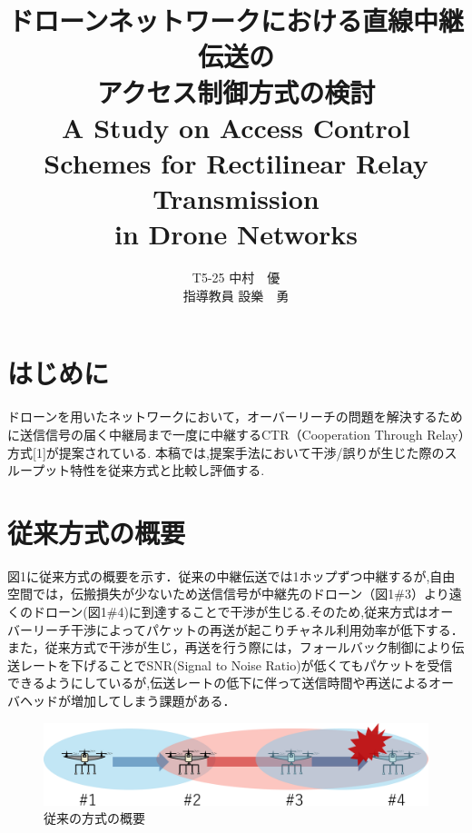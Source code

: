 \documentclass[a4paper,10pt]{ltjsarticle}
\title{\huge ドローンネットワークにおける直線中継伝送の\\アクセス制御方式の検討\\
\Large A Study on Access Control Schemes for Rectilinear Relay Transmission \\in Drone Networks
}
\author{
T5-25 \:中村　優\\
指導教員 \: 設樂　勇
}
\date{}
\begin{document}
\twocolumn[
\maketitle
]

\section{はじめに}
ドローンを用いたネットワークにおいて，オーバーリーチの問題を解決するために送信信号の届く中継局まで一度に中継するCTR（Cooperation Through Relay）方式[1]が提案されている. 本稿では,提案手法において干渉/誤りが生じた際のスループット特性を従来方式と比較し評価する.
\section{従来方式の概要}
図1に従来方式の概要を示す．従来の中継伝送では1ホップずつ中継するが,自由空間では，伝搬損失が少ないため送信信号が中継先のドローン（図1\#3）より遠くのドローン(図1\#4)に到達することで干渉が生じる.そのため,従来方式はオーバーリーチ干渉によってパケットの再送が起こりチャネル利用効率が低下する．また，従来方式で干渉が生じ，再送を行う際には，フォールバック制御により伝送レートを下げることでSNR(Signal to Noise Ratio)が低くてもパケットを受信できるようにしているが,伝送レートの低下に伴って送信時間や再送によるオーバヘッドが増加してしまう課題がある．%

\begin{figure}[H]
  \centering
  \includegraphics[width=\linewidth]{cenventional_topology.pdf} %
  \caption{従来の方式の概要}
  \label{fig:従来の方式のトポロジー} %
\end{figure}
\end{document}
